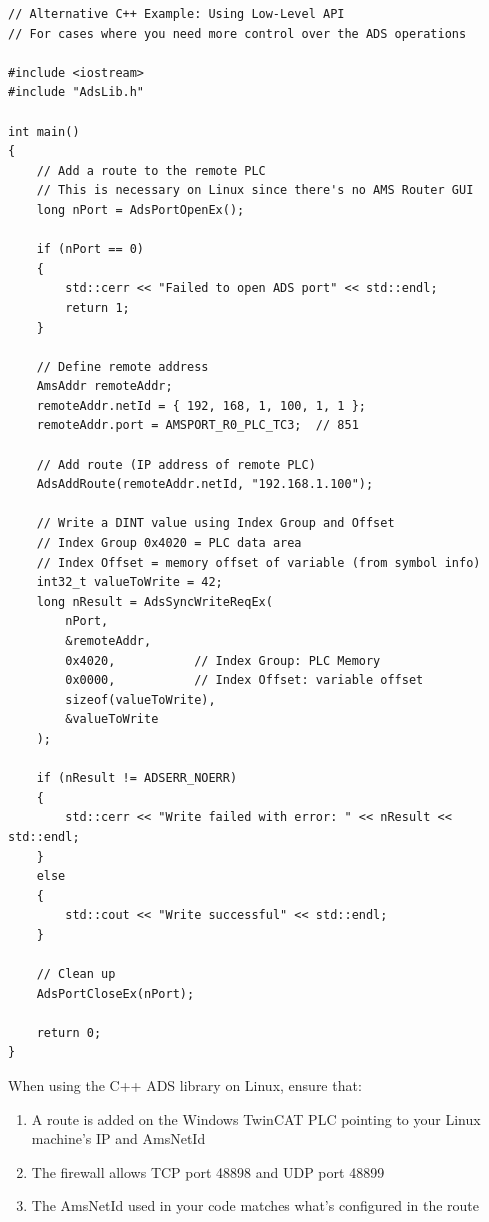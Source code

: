 \documentclass[11pt,a4paper]{article}
\begin{document}
\begin{lstlisting}[style=cppstyle]
// Alternative C++ Example: Using Low-Level API
// For cases where you need more control over the ADS operations

#include <iostream>
#include "AdsLib.h"

int main()
{
    // Add a route to the remote PLC
    // This is necessary on Linux since there's no AMS Router GUI
    long nPort = AdsPortOpenEx();
    
    if (nPort == 0)
    {
        std::cerr << "Failed to open ADS port" << std::endl;
        return 1;
    }
    
    // Define remote address
    AmsAddr remoteAddr;
    remoteAddr.netId = { 192, 168, 1, 100, 1, 1 };
    remoteAddr.port = AMSPORT_R0_PLC_TC3;  // 851
    
    // Add route (IP address of remote PLC)
    AdsAddRoute(remoteAddr.netId, "192.168.1.100");
    
    // Write a DINT value using Index Group and Offset
    // Index Group 0x4020 = PLC data area
    // Index Offset = memory offset of variable (from symbol info)
    int32_t valueToWrite = 42;
    long nResult = AdsSyncWriteReqEx(
        nPort,
        &remoteAddr,
        0x4020,           // Index Group: PLC Memory
        0x0000,           // Index Offset: variable offset
        sizeof(valueToWrite),
        &valueToWrite
    );
    
    if (nResult != ADSERR_NOERR)
    {
        std::cerr << "Write failed with error: " << nResult << std::endl;
    }
    else
    {
        std::cout << "Write successful" << std::endl;
    }
    
    // Clean up
    AdsPortCloseEx(nPort);
    
    return 0;
}
\end{lstlisting}

\begin{warningbox}
When using the C++ ADS library on Linux, ensure that:
\begin{enumerate}
    \item A route is added on the Windows TwinCAT PLC pointing to your Linux machine's IP and AmsNetId
    \item The firewall allows TCP port 48898 and UDP port 48899
    \item The AmsNetId used in your code matches what's configured in the route
\end{enumerate}
\end{warningbox}
\end{document}
